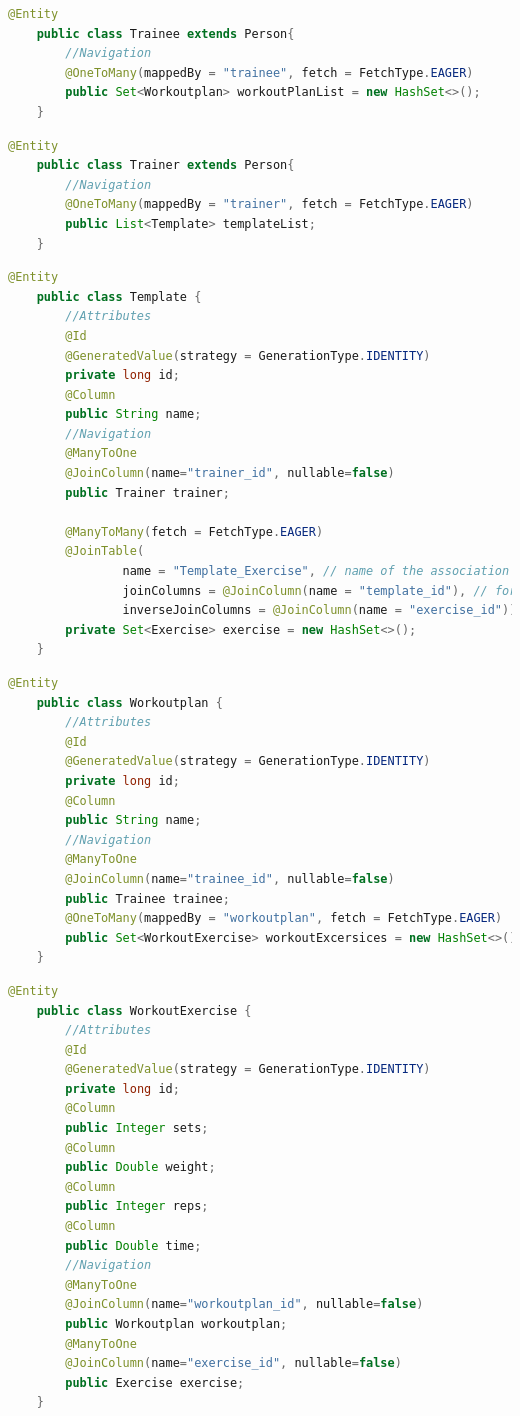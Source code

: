\begin{lstlisting}[language=Java,caption=Entity | Trainee,label=lst:impl:foo]
    @Entity
    public class Trainee extends Person{
        //Navigation
        @OneToMany(mappedBy = "trainee", fetch = FetchType.EAGER)
        public Set<Workoutplan> workoutPlanList = new HashSet<>();
    }
\end{lstlisting}

\begin{lstlisting}[language=Java,caption=Entity | Trainer,label=lst:impl:foo]
    @Entity
    public class Trainer extends Person{
        //Navigation
        @OneToMany(mappedBy = "trainer", fetch = FetchType.EAGER)
        public List<Template> templateList;
    }
\end{lstlisting}

\begin{lstlisting}[language=Java,caption=Entity | Template,label=lst:impl:foo]
    @Entity
    public class Template {
        //Attributes
        @Id
        @GeneratedValue(strategy = GenerationType.IDENTITY)
        private long id;
        @Column
        public String name;
        //Navigation
        @ManyToOne
        @JoinColumn(name="trainer_id", nullable=false)
        public Trainer trainer;
    
        @ManyToMany(fetch = FetchType.EAGER)
        @JoinTable(
                name = "Template_Exercise", // name of the association table
                joinColumns = @JoinColumn(name = "template_id"), // foreign key columns
                inverseJoinColumns = @JoinColumn(name = "exercise_id"))
        private Set<Exercise> exercise = new HashSet<>();
    }
\end{lstlisting}
\newpage
\begin{lstlisting}[language=Java,caption=Entity | Workoutplan,label=lst:impl:foo]
    @Entity
    public class Workoutplan {
        //Attributes
        @Id
        @GeneratedValue(strategy = GenerationType.IDENTITY)
        private long id;
        @Column
        public String name;
        //Navigation
        @ManyToOne
        @JoinColumn(name="trainee_id", nullable=false)
        public Trainee trainee;
        @OneToMany(mappedBy = "workoutplan", fetch = FetchType.EAGER)
        public Set<WorkoutExercise> workoutExcersices = new HashSet<>();
    }
\end{lstlisting}

\begin{lstlisting}[language=Java,caption=Entity | WorkoutExersice,label=lst:impl:foo]
    @Entity
    public class WorkoutExercise {
        //Attributes 
        @Id
        @GeneratedValue(strategy = GenerationType.IDENTITY)
        private long id;    
        @Column
        public Integer sets;    
        @Column
        public Double weight;    
        @Column
        public Integer reps;    
        @Column
        public Double time;    
        //Navigation   
        @ManyToOne
        @JoinColumn(name="workoutplan_id", nullable=false)
        public Workoutplan workoutplan;   
        @ManyToOne
        @JoinColumn(name="exercise_id", nullable=false)
        public Exercise exercise;
    }
\end{lstlisting}

